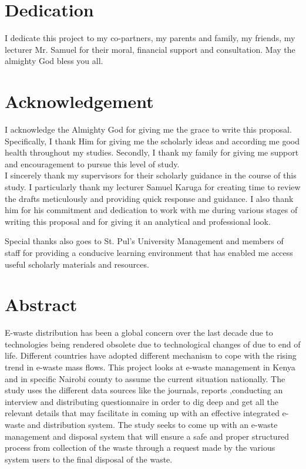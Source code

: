 \documentclass{article}
\begin{document}
\section*{Dedication}
I dedicate this project to my co-partners, my parents and family, my friends, my lecturer Mr. Samuel for their moral, financial support and consultation. May the almighty God bless you all.

\cleardoublepage

\section*{Acknowledgement}
I acknowledge the Almighty God for giving me the grace to write this proposal. Specifically, I thank Him for giving me the scholarly ideas and according me good health throughout my studies. Secondly, I thank my family for giving me support and encouragement to pursue this level of study.\\

I sincerely thank my supervisors for their scholarly guidance in the course of this study. I particularly thank  my lecturer Samuel Karuga for creating time to review the drafts meticulously and providing quick response and guidance. I also thank him for his commitment and dedication to work with me during various stages of writing this proposal and for giving it an analytical and professional look.

Special thanks also goes to St. Pul's University  Management and members of staff for providing a conducive learning environment that has enabled me access useful scholarly materials and resources.
\cleardoublepage



\tableofcontents
{}
\listoffigures
{}
\listoftables
\clearpage
\section*{Abstract}
E-waste distribution has been a global concern over the last decade due to technologies being rendered obsolete due to technological changes of due to end of life. Different countries have adopted different mechanism to cope with the rising trend in e-waste mass flows. This project looks at e-waste management in Kenya and in specific Nairobi county to assume the current situation nationally. The study uses the different data sources like the journals, reports ,conducting an interview and distributing questionnaire in order to dig deep and get all the relevant details that may facilitate in coming up with an effective  integrated e-waste and distribution system. The study seeks to come up with an e-waste management and disposal system that will ensure a safe and proper structured process from collection of the waste through a request made by the various system users to the final disposal of the waste.\\
\cleardoublepage
\end{document}
